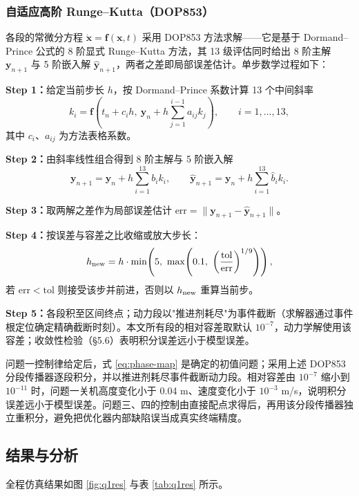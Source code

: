 \documentclass[withoutpreface,bwprint]{cumcmthesis}
\begin{document}
\subsubsection{自适应高阶 Runge--Kutta（DOP853）}
各段的常微分方程 $\dot{\bm x}=\bm f(\bm x,t)$ 采用 DOP853 方法求解——它是基于 Dormand--Prince 公式的 8 阶显式 Runge--Kutta 方法，其 13 级评估同时给出 8 阶主解 $\bm y_{n+1}$ 与 5 阶嵌入解 $\hat{\bm y}_{n+1}$，两者之差即局部误差估计。单步数学过程如下：

\textbf{Step 1：}给定当前步长 $h$，按 Dormand--Prince 系数计算 13 个中间斜率
\begin{equation}
k_i=\bm f\!\left(t_n+c_i h,\ \bm y_n+h\sum_{j=1}^{i-1}a_{ij}k_j\right),\qquad i=1,\dots,13,
\label{eq:rk-stage}
\end{equation}
其中 $c_i$、$a_{ij}$ 为方法表格系数。

\textbf{Step 2：}由斜率线性组合得到 8 阶主解与 5 阶嵌入解
\begin{equation}
\bm y_{n+1}=\bm y_n+h\sum_{i=1}^{13}b_i k_i,\qquad
\hat{\bm y}_{n+1}=\bm y_n+h\sum_{i=1}^{13}\hat b_i k_i.
\label{eq:rk-step}
\end{equation}

\textbf{Step 3：}取两解之差作为局部误差估计 $\mathrm{err}=\|\bm y_{n+1}-\hat{\bm y}_{n+1}\|$。

\textbf{Step 4：}按误差与容差之比收缩或放大步长：
\begin{equation}
h_{\rm new}=h\cdot\min\!\left(5,\ \max\!\left(0.1,\ \left(\frac{\mathrm{tol}}{\mathrm{err}}\right)^{1/9}\right)\right),
\label{eq:rk-adapt}
\end{equation}
若 $\mathrm{err}<\mathrm{tol}$ 则接受该步并前进，否则以 $h_{\rm new}$ 重算当前步。

\textbf{Step 5：}各段积至区间终点；动力段以"推进剂耗尽"为事件截断（求解器通过事件根定位确定精确截断时刻）。本文所有段的相对容差取默认 $10^{-7}$，动力学解使用该容差；收敛性检验（§5.6）表明积分误差远小于模型误差。

问题一控制律给定后，式 \eqref{eq:phase-map} 是确定的初值问题；采用上述 DOP853 分段传播器逐段积分，并以推进剂耗尽事件截断动力段。相对容差由 $10^{-7}$ 缩小到 $10^{-11}$ 时，问题一关机高度变化小于 0.04 m、速度变化小于 $10^{-3}$ m/s，说明积分误差远小于模型误差。问题三、四的控制由直接配点求得后，再用该分段传播器独立重积分，避免把优化器内部缺陷误当成真实终端精度。

\subsection{结果与分析}
全程仿真结果如图 \ref{fig:q1res} 与表 \ref{tab:q1res} 所示。
\end{document}
